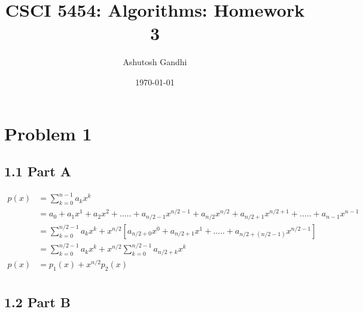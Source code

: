 \documentclass[12pt]{article}
\title{CSCI 5454: Algorithms: Homework 3}
\author{Ashutosh Gandhi}
\date{\today}
\begin{document}
\maketitle

\section*{Problem 1}


\subsection*{1.1 Part A} 

\vspace{10pt}



\begin{equation}
\begin{aligned}
\nonumber
p(x)&=\sum_{k=0}^{n-1} a_kx^k \\
&=a_0+a_1x^1+a_2x^2+.....+a_{n/2-1}x^{n/2-1}+a_{n/2}x^{n/2}+a_{n/2+1}x^{n/2+1}+.....+a_{n-1}x^{n-1} \\
&=\sum_{k=0}^{n/2-1} a_kx^k+x^{n/2}[a_{n/2+0}x^{0}+a_{n/2+1}x^{1}+.....+a_{n/2+(n/2-1)}x^{n/2-1}] \\
&=\sum_{k=0}^{n/2-1} a_kx^k +x^{n/2} \sum_{k=0}^{n/2-1} a_{n/2+k}x^{k} \\
p(x)&=p_1(x)+x^{n/2}p_2(x) \\
\end{aligned}
\end{equation}

\subsection*{1.2 Part B} 

\vspace{-1pt}
\end{document}
